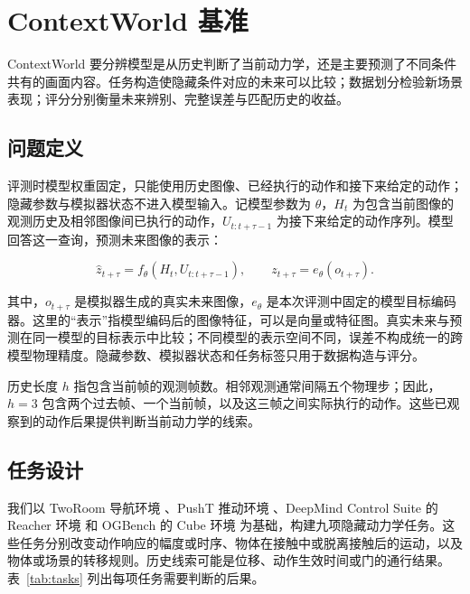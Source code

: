 \documentclass[10pt,twocolumn,letterpaper]{article}
\begin{document}
\section{ContextWorld 基准}
\label{sec:benchmark}

ContextWorld 要分辨模型是从历史判断了当前动力学，还是主要预测了不同条件共有的画面内容。任务构造使隐藏条件对应的未来可以比较；数据划分检验新场景表现；评分分别衡量未来辨别、完整误差与匹配历史的收益。

\subsection{问题定义}
\label{sec:problem}

评测时模型权重固定，只能使用历史图像、已经执行的动作和接下来给定的动作；隐藏参数与模拟器状态不进入模型输入。记模型参数为 $\theta$，$H_t$ 为包含当前图像的观测历史及相邻图像间已执行的动作，$U_{t:t+\tau-1}$ 为接下来给定的动作序列。模型回答这一查询，预测未来图像的表示：

\[
\hat z_{t+\tau}=f_\theta(H_t,U_{t:t+\tau-1}),\qquad
z_{t+\tau}=e_\theta(o_{t+\tau}).
\]

其中，$o_{t+\tau}$ 是模拟器生成的真实未来图像，$e_\theta$ 是本次评测中固定的模型目标编码器。这里的“表示”指模型编码后的图像特征，可以是向量或特征图。真实未来与预测在同一模型的目标表示中比较；不同模型的表示空间不同，误差不构成统一的跨模型物理精度。隐藏参数、模拟器状态和任务标签只用于数据构造与评分。

历史长度 $h$ 指包含当前帧的观测帧数。相邻观测通常间隔五个物理步；因此，$h=3$ 包含两个过去帧、一个当前帧，以及这三帧之间实际执行的动作。这些已观察到的动作后果提供判断当前动力学的线索。

\subsection{任务设计}
\label{sec:tasks}

我们以 TwoRoom 导航环境 \cite{zhou2025dinowm}、PushT 推动环境 \cite{chi2023diffusionpolicy}、DeepMind Control Suite 的 Reacher 环境 \cite{tassa2018control} 和 OGBench 的 Cube 环境 \cite{park2025ogbench} 为基础，构建九项隐藏动力学任务。这些任务分别改变动作响应的幅度或时序、物体在接触中或脱离接触后的运动，以及物体或场景的转移规则。历史线索可能是位移、动作生效时间或门的通行结果。表~\ref{tab:tasks} 列出每项任务需要判断的后果。
\end{document}
